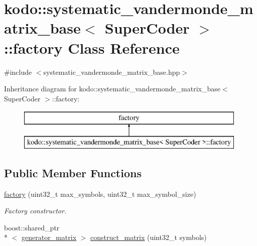 \hypertarget{classkodo_1_1systematic__vandermonde__matrix__base_1_1factory}{\section{kodo\-:\-:systematic\-\_\-vandermonde\-\_\-matrix\-\_\-base$<$ Super\-Coder $>$\-:\-:factory Class Reference}
\label{classkodo_1_1systematic__vandermonde__matrix__base_1_1factory}
}


{\ttfamily \#include $<$systematic\-\_\-vandermonde\-\_\-matrix\-\_\-base.\-hpp$>$}

Inheritance diagram for kodo\-:\-:systematic\-\_\-vandermonde\-\_\-matrix\-\_\-base$<$ Super\-Coder $>$\-:\-:factory\-:\begin{figure}[H]
\begin{center}
\leavevmode
\includegraphics[height=2.000000cm]{classkodo_1_1systematic__vandermonde__matrix__base_1_1factory}
\end{center}
\end{figure}
\subsection*{Public Member Functions}
\begin{DoxyCompactItemize}
\item 
\hyperlink{classkodo_1_1systematic__vandermonde__matrix__base_1_1factory_a9528f9ee1c23dc6cba9c9f988b345dd8}{factory} (uint32\-\_\-t max\-\_\-symbols, uint32\-\_\-t max\-\_\-symbol\-\_\-size)
\begin{DoxyCompactList}\small\item\em Factory constructor. \end{DoxyCompactList}\item 
boost\-::shared\-\_\-ptr\\*
$<$ \hyperlink{classkodo_1_1systematic__vandermonde__matrix__base_aaf2997cff2b17f25e18b93f26b10eefd}{generator\-\_\-matrix} $>$ \hyperlink{classkodo_1_1systematic__vandermonde__matrix__base_1_1factory_aa3a330b58bbac2ce67746da5249a151a}{construct\-\_\-matrix} (uint32\-\_\-t symbols)
\end{DoxyCompactItemize}


